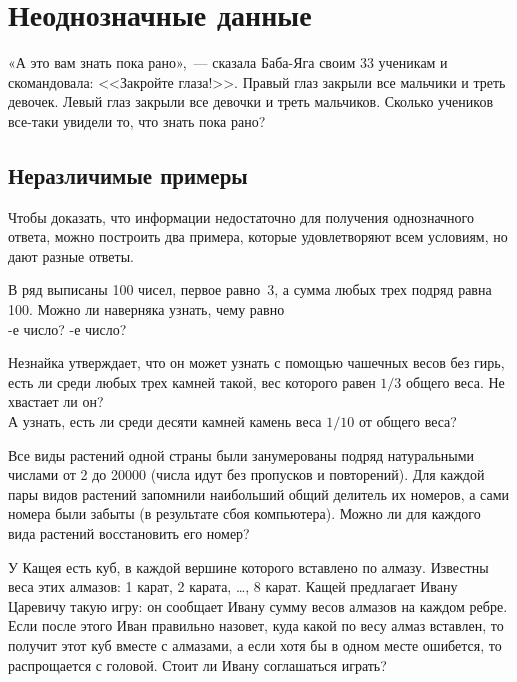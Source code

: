 
\section*{Неоднозначные данные}



\begin{flushright}
«А это вам знать пока рано»,~--- сказала Баба-Яга своим 33 ученикам
и скомандовала:
<<Закройте глаза!>>.
Правый глаз закрыли все мальчики и треть девочек.
Левый глаз закрыли все девочки и треть мальчиков.
Сколько учеников все-таки увидели то, что знать пока рано?
\end{flushright}

\subsection*{Неразличимые примеры}

Чтобы доказать, что информации недостаточно для получения однозначного ответа,
можно построить два примера, которые удовлетворяют всем условиям, но дают
разные ответы.

\begin{problems}

\item
В ряд выписаны 100 чисел, первое равно~3, а сумма любых трех подряд равна 100.
Можно ли наверняка узнать, чему равно
\\
-е число?
\quad
{}-е число?

\item
\sp
Незнайка утверждает, что он может узнать с помощью чашечных весов без гирь,
есть ли среди любых трех камней такой, вес которого равен $1/3$ общего веса.
Не хвастает ли он?
\\
\sp
А узнать, есть ли среди десяти камней камень веса $1/10$ от общего веса?

\item
Все виды растений одной страны были занумерованы подряд натуральными числами
от 2 до 20000 (числа идут без пропусков и повторений).
Для каждой пары видов растений запомнили наибольший общий делитель их номеров,
а сами номера были забыты (в результате сбоя компьютера).
Можно ли для каждого вида растений восстановить его номер?

\item
У Кащея есть куб, в каждой вершине которого вставлено по алмазу.
Известны веса этих алмазов: 1 карат, 2 карата, \ldots, 8 карат.
Кащей предлагает Ивану Царевичу такую игру: он сообщает Ивану сумму весов
алмазов на каждом ребре.
Если после этого Иван правильно назовет, куда какой по весу алмаз вставлен,
то получит этот куб вместе с алмазами, а если хотя бы в одном месте ошибется,
то распрощается с головой.
Стоит ли Ивану соглашаться играть?

\end{problems}

